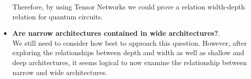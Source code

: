 \begin{itemize}
    Therefore, by using Tensor Networks we could prove a relation width-depth relation
    for quantum circuits. 
    
    \item \textbf{Are narrow architectures contained in wide architectures?}.\\
    We still need to consider how best to approach this question. However, after exploring the 
    relationships between depth and width as well as shallow and deep architectures, it seems logical to 
    now examine the relationship between narrow and wide architectures.
    
\end{itemize}